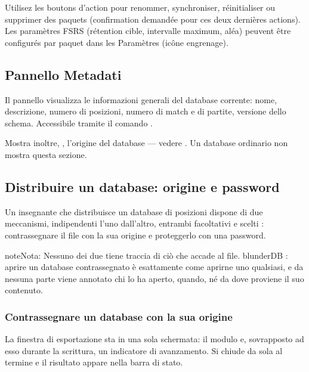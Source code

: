 \documentclass[letterpaper,10pt,italian]{sphinxmanual}
\begin{document}
\sphinxAtStartPar
{} Utilisez les boutons d’action pour renommer,
synchroniser, réinitialiser ou supprimer des paquets (confirmation demandée
pour ces deux dernières actions). Les paramètres FSRS (rétention cible,
intervalle maximum, aléa) peuvent être configurés par paquet dans les
Paramètres (icône engrenage).


\subsection{Pannello Metadati}
\label{\detokenize{manuel:panneau-metadonnees}}\label{\detokenize{manuel:panneau-metadata}}
\sphinxAtStartPar
Il pannello  visualizza le informazioni generali del database corrente: nome, descrizione, numero di posizioni, numero di match e di partite, versione dello schema. Accessibile tramite il comando .

\sphinxAtStartPar
Mostra inoltre, , l’origine del database — vedere {\hyperref[\detokenize{manuel:diffusion-controlee}]{}}. Un database ordinario non mostra questa sezione.


\subsection{Distribuire un database: origine e password}
\label{\detokenize{manuel:diffuser-une-base-origine-et-mot-de-passe}}\label{\detokenize{manuel:diffusion-controlee}}
\sphinxAtStartPar
Un insegnante che distribuisce un database di posizioni dispone di due meccanismi, indipendenti l’uno dall’altro, entrambi facoltativi e scelti : contrassegnare il file con la sua origine e proteggerlo con una password.

\begin{sphinxadmonition}{note}{Nota:}
\sphinxAtStartPar
Nessuno dei due tiene traccia di ciò che accade al file. blunderDB : aprire un database contrassegnato è esattamente come aprirne uno qualsiasi, e da nessuna parte viene annotato chi lo ha aperto, quando, né da dove proviene il suo contenuto.
\end{sphinxadmonition}


\subsubsection{Contrassegnare un database con la sua origine}
\label{\detokenize{manuel:marquer-une-base-de-son-origine}}
\sphinxAtStartPar
La finestra di esportazione sta in una sola schermata: il modulo e, sovrapposto ad esso durante la scrittura, un indicatore di avanzamento. Si chiude da sola al termine e il risultato appare nella barra di stato.
\end{document}
